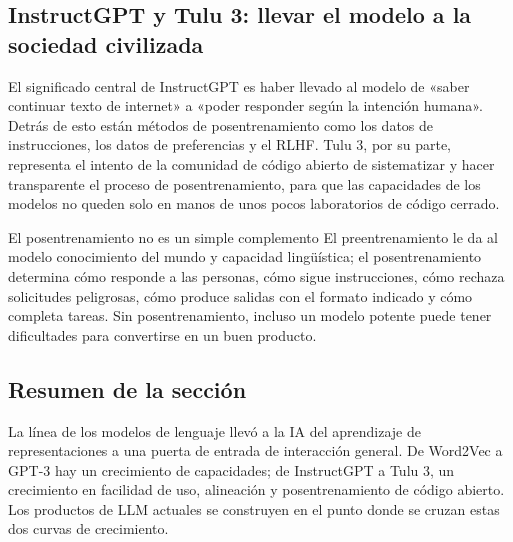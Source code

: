 \subsection{InstructGPT y Tulu 3: llevar el modelo a la sociedad civilizada}

El significado central de InstructGPT es haber llevado al modelo de «saber continuar texto de internet» a «poder responder según la intención humana». Detrás de esto están métodos de posentrenamiento como los datos de instrucciones, los datos de preferencias y el RLHF. Tulu 3, por su parte, representa el intento de la comunidad de código abierto de sistematizar y hacer transparente el proceso de posentrenamiento, para que las capacidades de los modelos no queden solo en manos de unos pocos laboratorios de código cerrado.

\begin{warningbox}{El posentrenamiento no es un simple complemento}
El preentrenamiento le da al modelo conocimiento del mundo y capacidad lingüística; el posentrenamiento determina cómo responde a las personas, cómo sigue instrucciones, cómo rechaza solicitudes peligrosas, cómo produce salidas con el formato indicado y cómo completa tareas. Sin posentrenamiento, incluso un modelo potente puede tener dificultades para convertirse en un buen producto.
\end{warningbox}

\subsection{Resumen de la sección}

La línea de los modelos de lenguaje llevó a la IA del aprendizaje de representaciones a una puerta de entrada de interacción general. De Word2Vec a GPT-3 hay un crecimiento de capacidades; de InstructGPT a Tulu 3, un crecimiento en facilidad de uso, alineación y posentrenamiento de código abierto. Los productos de LLM actuales se construyen en el punto donde se cruzan estas dos curvas de crecimiento.
